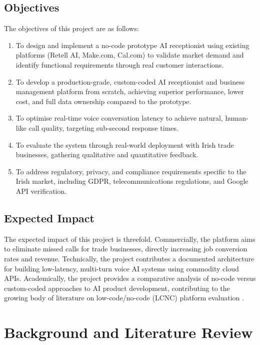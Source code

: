\documentclass[conference]{IEEEtran}
\begin{document}
\subsection{Objectives}

The objectives of this project are as follows:

\begin{enumerate}
\item To design and implement a no-code prototype AI receptionist using existing platforms (Retell AI, Make.com, Cal.com) to validate market demand and identify functional requirements through real customer interactions.
\item To develop a production-grade, custom-coded AI receptionist and business management platform from scratch, achieving superior performance, lower cost, and full data ownership compared to the prototype.
\item To optimise real-time voice conversation latency to achieve natural, human-like call quality, targeting sub-second response times.
\item To evaluate the system through real-world deployment with Irish trade businesses, gathering qualitative and quantitative feedback.
\item To address regulatory, privacy, and compliance requirements specific to the Irish market, including GDPR, telecommunications regulations, and Google API verification.
\end{enumerate}

\subsection{Expected Impact}

The expected impact of this project is threefold. Commercially, the platform aims to eliminate missed calls for trade businesses, directly increasing job conversion rates and revenue. Technically, the project contributes a documented architecture for building low-latency, multi-turn voice AI systems using commodity cloud APIs. Academically, the project provides a comparative analysis of no-code versus custom-coded approaches to AI product development, contributing to the growing body of literature on low-code/no-code (LCNC) platform evaluation \cite{b2}.


\section{Background and Literature Review}
\end{document}
